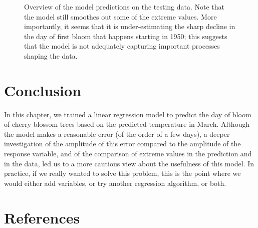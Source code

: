 \documentclass[
  letterpaper,
]{scrbook}
\begin{document}
\begin{figure}[pbt]
{}

\caption{\label{fig-splits-detail}Overview of the model predictions on
the testing data. Note that the model still smoothes out some of the
extreme values. More importantly, it seems that it is under-estimating
the sharp decline in the day of first bloom that happens starting in
1950; this suggests that the model is not adequately capturing important
processes shaping the data.}

\end{figure}%

\section{Conclusion}\label{conclusion-2}

In this chapter, we trained a linear regression model to predict the day
of bloom of cherry blossom trees based on the predicted temperature in
March. Although the model makes a reasonable error (of the order of a
few days), a deeper investigation of the amplitude of this error
compared to the amplitude of the response variable, and of the
comparison of extreme values in the prediction and in the data, led us
to a more cautious view about the usefulness of this model. In practice,
if we really wanted to solve this problem, this is the point where we
would either add variables, or try another regression algorithm, or
both.

\section*{References}\label{bibliography-4}

\end{document}
